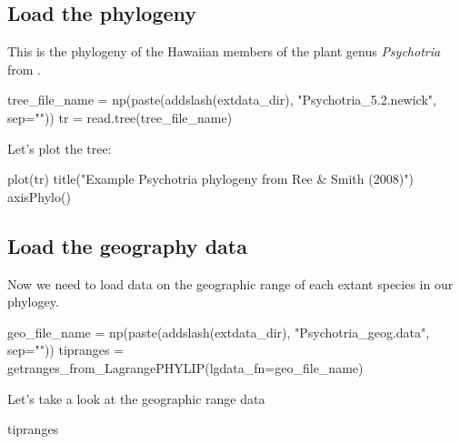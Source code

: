\documentclass[11pt]{article}
\begin{document}
\subsection{Load the phylogeny}

This is the phylogeny of the
 Hawaiian members of the
plant genus \textit{Psychotria} 
from \citet{ree2008maximum}. 
\begin{code}
tree_file_name = np(paste(addslash(extdata_dir), "Psychotria_5.2.newick", sep=""))
tr = read.tree(tree_file_name)
\end{code}
Let's plot the tree:
\begin{code}
plot(tr)
title("Example Psychotria phylogeny from Ree & Smith (2008)")
axisPhylo()
\end{code}


\subsection{Load the geography data}

Now we need to load data on the geographic range of each extant
species in our phylogey.
\begin{code}
geo_file_name = np(paste(addslash(extdata_dir), "Psychotria_geog.data", sep=""))
tipranges = getranges_from_LagrangePHYLIP(lgdata_fn=geo_file_name)
\end{code}
Let's take a look at the geographic range data
\begin{code}
tipranges
\end{code}
\end{document}
